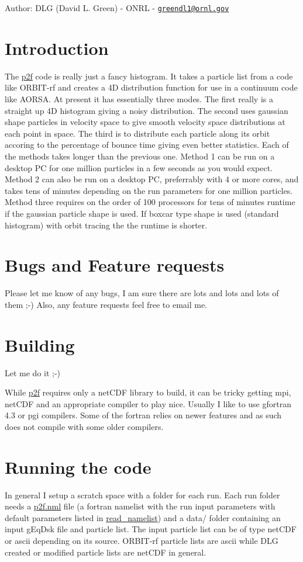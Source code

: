 \begin{Desc}
\item[Author:]DLG (David L. Green) - ONRL - \href{mailto:greendl1@ornl.gov}{\tt greendl1@ornl.gov}\end{Desc}
\hypertarget{index_intro_sec}{}\section{Introduction}\label{index_intro_sec}
The \hyperlink{namespacep2f}{p2f} code is really just a fancy histogram. It takes a particle list from a code like ORBIT-rf and creates a 4D distribution function for use in a continuum code like AORSA. At present it has essentially three modes. The first really is a straight up 4D histogram giving a noisy distribution. The second uses gaussian shape particles in velocity space to give smooth velocity space distributions at each point in space. The third is to distribute each particle along its orbit accoring to the percentage of bounce time giving even better statistics. Each of the methods takes longer than the previous one. Method 1 can be run on a desktop PC for one million particles in a few seconds as you would expect. Method 2 can also be run on a desktop PC, preferrably with 4 or more cores, and takes tens of minutes depending on the run parameters for one million particles. Method three requires on the order of 100 processors for tens of minutes runtime if the gaussian particle shape is used. If boxcar type shape is used (standard histogram) with orbit tracing the the runtime is shorter.\hypertarget{index_bugs}{}\section{Bugs and Feature requests}\label{index_bugs}
Please let me know of any bugs, I am sure there are lots and lots and lots of them ;-) Also, any feature requests feel free to email me.\hypertarget{index_install_sec}{}\section{Building}\label{index_install_sec}
Let me do it ;-)

While \hyperlink{namespacep2f}{p2f} requires only a netCDF library to build, it can be tricky getting mpi, netCDF and an appropriate compiler to play nice. Usually I like to use gfortran 4.3 or pgi compilers. Some of the fortran relies on newer features and as such does not compile with some older compilers.\hypertarget{index_run_sec}{}\section{Running the code}\label{index_run_sec}
In general I setup a scratch space with a folder for each run. Each run folder needs a \hyperlink{p2f_8nml_source}{p2f.nml} file (a fortran namelist with the run input parameters with default parameters listed in \hyperlink{namespaceread__namelist}{read\_\-namelist}) and a data/ folder containing an input gEqDsk file and particle list. The input particle list can be of type netCDF or ascii depending on its source. ORBIT-rf particle lists are ascii while DLG created or modified particle lists are netCDF in general.

